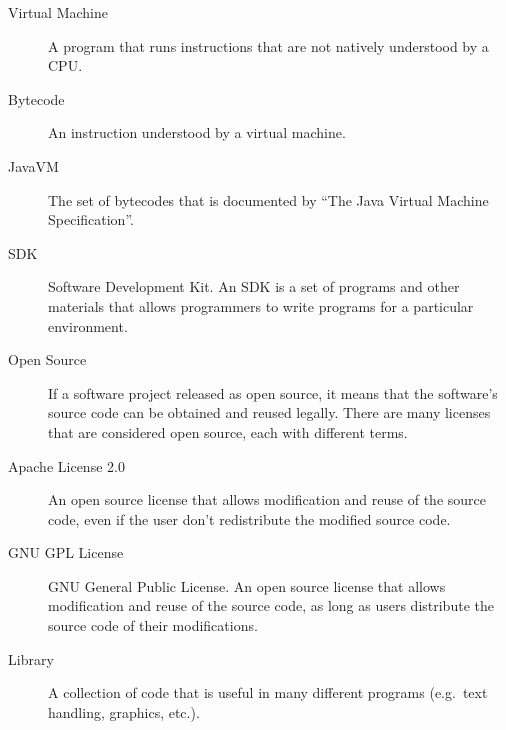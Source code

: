 \documentclass[11pt]{article}
\begin{document}
\begin{multicols}{2}
\begin{description}
    \item[Virtual Machine] A program that runs instructions that are not
    natively understood by a CPU.
    \item[Bytecode] An instruction understood by a virtual machine.
    \item[JavaVM] The set of bytecodes that is documented by ``The Java Virtual
    Machine Specification''. \cite{javavm-bytecode}
    \item[SDK] Software Development Kit.  An SDK is a set of programs and other
    materials that allows programmers to write programs for a particular
    environment.
    \item[Open Source] If a software project released as open source, it means
    that the software's source code can be obtained and reused legally.  There
    are many licenses that are considered open source, each with different
    terms.
    \item[Apache License 2.0] An open source license that allows modification
    and reuse of the source code, even if the user don't redistribute the
    modified source code. \cite{apache-license}
    \item[GNU GPL License] GNU General Public License.  An open source license
    that allows modification and reuse of the source code, as long as users
    distribute the source code of their modifications. \cite{gpl-license}
    \item[Library] A collection of code that is useful in many different
    programs (e.g.\ text handling, graphics, etc.).
\end{description}


\end{multicols}
\newpage

\nocite{*}


\end{document}
